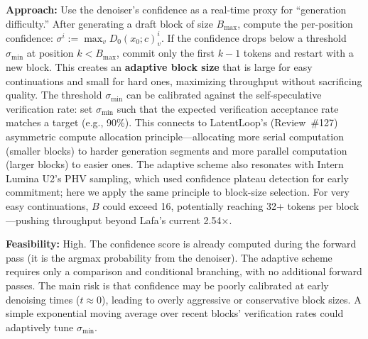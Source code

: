 \documentclass[11pt,a4paper]{article}
\begin{document}
\textbf{Approach:} Use the denoiser's confidence as a real-time proxy for ``generation difficulty.'' After generating a draft block of size $B_{\max}$, compute the per-position confidence: $\sigma^i := \max_v D_0(x_0; c)^i_v$. If the confidence drops below a threshold $\sigma_{\min}$ at position $k < B_{\max}$, commit only the first $k{-}1$ tokens and restart with a new block. This creates an \textbf{adaptive block size} that is large for easy continuations and small for hard ones, maximizing throughput without sacrificing quality. The threshold $\sigma_{\min}$ can be calibrated against the self-speculative verification rate: set $\sigma_{\min}$ such that the expected verification acceptance rate matches a target (e.g., 90\%). This connects to LatentLoop's (Review~\#127) asymmetric compute allocation principle---allocating more serial computation (smaller blocks) to harder generation segments and more parallel computation (larger blocks) to easier ones. The adaptive scheme also resonates with Intern Lumina U2's PHV sampling, which used confidence plateau detection for early commitment; here we apply the same principle to block-size selection. For very easy continuations, $B$ could exceed 16, potentially reaching 32+ tokens per block---pushing throughput beyond Lafa's current 2.54$\times$.

\textbf{Feasibility:} High. The confidence score is already computed during the forward pass (it is the argmax probability from the denoiser). The adaptive scheme requires only a comparison and conditional branching, with no additional forward passes. The main risk is that confidence may be poorly calibrated at early denoising times ($t \approx 0$), leading to overly aggressive or conservative block sizes. A simple exponential moving average over recent blocks' verification rates could adaptively tune $\sigma_{\min}$.
\end{document}
